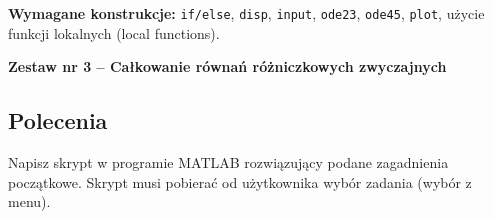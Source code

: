 \documentclass[a4paper,11pt]{article}
\begin{document}
\vspace{0.3cm}
\begin{ramka}
\textbf{Wymagane konstrukcje:}
\texttt{if/else}, \texttt{disp}, \texttt{input}, \texttt{ode23}, \texttt{ode45}, \texttt{plot}, użycie funkcji lokalnych (local functions).
\end{ramka}

\clearpage
\begin{center}
  {\large\bfseries Zestaw nr 3 \quad -- \quad Całkowanie równań różniczkowych zwyczajnych}
\end{center}
\hrulefill
\vspace{0.4cm}

\subsection*{Polecenia}

Napisz skrypt w programie MATLAB rozwiązujący podane zagadnienia początkowe. Skrypt musi pobierać od użytkownika wybór zadania (wybór z menu).
\end{document}
